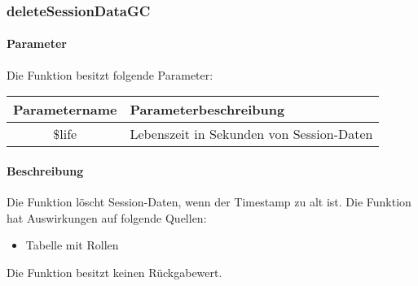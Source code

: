 \subsubsection{deleteSessionDataGC}
\paragraph{Parameter} Die Funktion besitzt folgende Parameter:
\begin{table}[H]
	\begin{tabular}{|c|p{11cm}|}
		\hline
		\textbf{Parametername} & \textbf{Parameterbeschreibung} \\ \hline
		\$life & Lebenszeit in Sekunden von Session-Daten \\ \hline
	\end{tabular}
\end{table}
\paragraph{Beschreibung} Die Funktion löscht Session-Daten, wenn der Timestamp zu alt ist. Die Funktion hat Auswirkungen auf folgende Quellen:
\begin{itemize}
	\item Tabelle mit Rollen
\end{itemize}
Die Funktion besitzt keinen Rückgabewert.